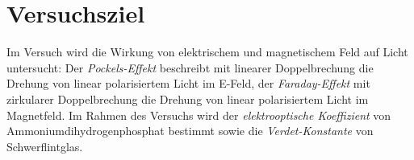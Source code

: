 \section{Versuchsziel}
Im Versuch wird die Wirkung von elektrischem und magnetischem Feld auf Licht untersucht:
Der \emph{Pockels-Effekt} beschreibt mit linearer Doppelbrechung die
Drehung von linear polarisiertem Licht im E-Feld,
der \emph{Faraday-Effekt} mit zirkularer Doppelbrechung die Drehung von linear polarisiertem Licht im Magnetfeld.
Im Rahmen des Versuchs wird der \emph{elektrooptische Koeffizient} von Ammoniumdihydrogenphosphat bestimmt
sowie die \emph{Verdet-Konstante} von Schwerflintglas.